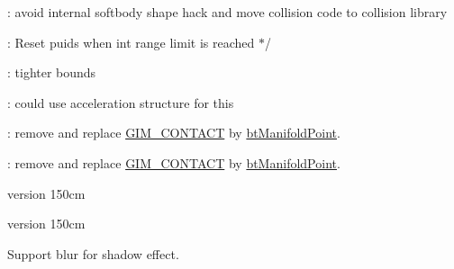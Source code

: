 \begin{DoxyRefList}
\item[\label{todo__todo000037}%
\Hypertarget{todo__todo000037}%
Member \hyperlink{classbtSoftBody_aced0f5421eeb1491a3fd77bb91e2e5af}{bt\+Soft\+Body\+:\+:set\+Collision\+Shape} (bt\+Collision\+Shape $\ast$collision\+Shape)]\+: avoid internal softbody shape hack and move collision code to collision library  
\item[\label{todo__todo000038}%
\Hypertarget{todo__todo000038}%
Member \hyperlink{structbtSparseSdf_a08dbaa356f577ebbd0808329766111d1}{bt\+Sparse\+Sdf$<$ C\+E\+L\+L\+S\+I\+ZE $>$\+:\+:Garbage\+Collect} (int lifetime=256)]\+: Reset puid\textquotesingle{}s when int range limit is reached $\ast$/  
\item[\label{todo__todo000018}%
\Hypertarget{todo__todo000018}%
Member \hyperlink{classbtSphereTriangleCollisionAlgorithm_af6de517d0a45abb91df4f61c5867c8f1}{bt\+Sphere\+Triangle\+Collision\+Algorithm\+:\+:process\+Collision} (const \hyperlink{structbtCollisionObjectWrapper}{bt\+Collision\+Object\+Wrapper} $\ast$body0\+Wrap, const \hyperlink{structbtCollisionObjectWrapper}{bt\+Collision\+Object\+Wrapper} $\ast$body1\+Wrap, const \hyperlink{structbtDispatcherInfo}{bt\+Dispatcher\+Info} \&dispatch\+Info, \hyperlink{classbtManifoldResult}{bt\+Manifold\+Result} $\ast$result\+Out)]\+: tighter bounds  
\item[\label{todo__todo000024}%
\Hypertarget{todo__todo000024}%
Member \hyperlink{classbtTriangleMesh_a3b521a1faa5862a818d9f983230749a2}{bt\+Triangle\+Mesh\+:\+:find\+Or\+Add\+Vertex} (const bt\+Vector3 \&vertex, bool remove\+Duplicate\+Vertices)]\+: could use acceleration structure for this  
\item[\label{todo__todo000025}%
\Hypertarget{todo__todo000025}%
Class \hyperlink{classGIM__CONTACT}{G\+I\+M\+\_\+\+C\+O\+N\+T\+A\+CT} ]\+: remove and replace \hyperlink{classGIM__CONTACT}{G\+I\+M\+\_\+\+C\+O\+N\+T\+A\+CT} by \hyperlink{classbtManifoldPoint}{bt\+Manifold\+Point}. 

\+: remove and replace \hyperlink{classGIM__CONTACT}{G\+I\+M\+\_\+\+C\+O\+N\+T\+A\+CT} by \hyperlink{classbtManifoldPoint}{bt\+Manifold\+Point}.  
\item[\label{todo__todo000057}%
\Hypertarget{todo__todo000057}%
Member \hyperlink{classIrSensor_ade39a20d2ec88e9ad4686e062093c91d}{Ir\+Sensor\+:\+:gp2\+Convert} (int type, int value)]version 150cm 

version 150cm  
\item[\label{todo__todo000005}%
\Hypertarget{todo__todo000005}%
Member \hyperlink{classLabel_a274a555bb2bd7b10d36a9de5ee361399}{Label\+:\+:enable\+Shadow} (const \hyperlink{structColor4B}{Color4B} \&shadow\+Color=Color4\+B\+::\+B\+L\+A\+CK, const \hyperlink{classSize}{Size} \&offset=\hyperlink{classSize}{Size}(2,-\/2), int blur\+Radius=0)]Support blur for shadow effect. 


\end{DoxyRefList}
